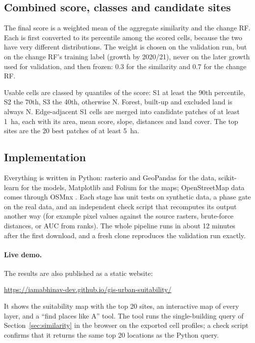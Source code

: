 \subsection{Combined score, classes and candidate sites}

The final score is a weighted mean of the aggregate similarity and the change RF. Each is first
converted to its percentile among the scored cells, because the two have very different
distributions. The weight is chosen on the validation run, but on the change RF's training label
(growth by 2020/21), never on the later growth used for validation, and then frozen: 0.3 for the
similarity and 0.7 for the change RF.

Usable cells are classed by quantiles of the score: S1 at least the 90th percentile, S2 the 70th,
S3 the 40th, otherwise N. Forest, built-up and excluded land is always N. Edge-adjacent S1 cells
are merged into candidate patches of at least \SI{1}{\hectare}, each with its area, mean score,
slope, distances and land cover. The top sites are the 20 best patches of at least
\SI{5}{\hectare}.

\subsection{Implementation}

Everything is written in Python: rasterio and GeoPandas for the data, scikit-learn for the
models, Matplotlib and Folium for the maps; OpenStreetMap data comes through OSMnx
\citep{boeing2017}. Each stage has unit tests on synthetic data, a phase gate on the real data,
and an independent check script that recomputes its output another way (for example pixel
values against the source rasters, brute-force distances, or AUC from ranks). The whole pipeline
runs in about 12 minutes after the first download, and a fresh clone reproduces the validation
run exactly.

\paragraph{Live demo.} The results are also published as a static website:
\begin{center}
  \url{https://iamabhinav-dev.github.io/gis-urban-suitability/}
\end{center}
It shows the suitability map with the top 20 sites, an interactive map of every layer, and a
``find places like A'' tool. The tool runs the single-building query of Section~\ref{sec:similarity}
in the browser on the exported cell profiles; a check script confirms that it returns the same
top 20 locations as the Python query.
